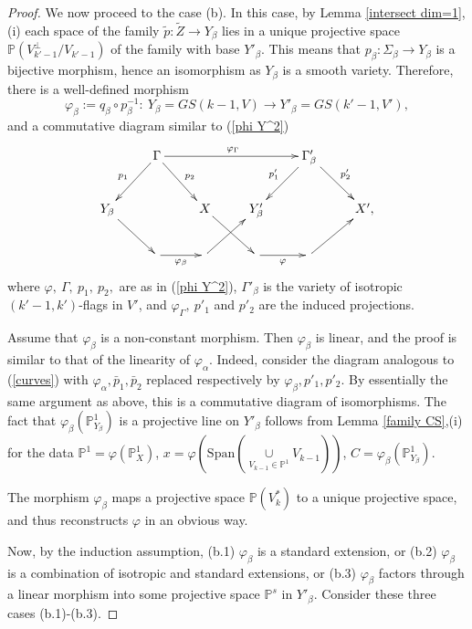 \documentclass[12pt]{amsart}
\newcommand\Span{\text{Span}}
\renewcommand{\phi}{\varphi}
\theoremstyle{definition}
\begin{document}
\begin{proof}
We now proceed to the case (b). In this case,
by Lemma \ref{intersect dim=1},(i) each space of the family $\tilde{p}:\tilde{Z}\to Y_{\beta}$ lies in a unique
projective space $\mathbb{P}(V_{k'-1}^\bot/V_{k'-1})$ of the family with base $Y'_{\beta}$. This
means that $p_{\beta}:\Sigma_{\beta}\to Y_{\beta}$ is a bijective morphism, hence an isomorphism as $Y_{\beta}$ is
a smooth variety. Therefore, there is a well-defined morphism
\begin{equation}\label{1mor i}
\phi_{\beta}:=q_{\beta}\circ p_{\beta}^{-1}:\ Y_{\beta}=GS(k-1,V)\to Y'_{\beta}=GS(k'-1,V'),
\end{equation}
and a commutative diagram similar to (\ref{phi Y^2})
\begin{equation}\label{phi Y^1}
\xymatrix{
& \Gamma\ar[rrr]^{\phi_{\Gamma}}\ar[dl]_{p_1}\ar[dr]^{p_2}&&& \Gamma'_{\beta}\ar[dl]_{p'_1}\ar[dr]^{p'_2}&
\\
Y_{\beta}\ar[dr]&& X\ar[dr]& Y'_{\beta} && X',\\
&\ar[r]_{\phi_{\beta}}&\ar[ur]&\ar[r]_{\phi}&\ar[ur]& }
\end{equation}
where $\phi,\ \Gamma,\ p_1,\ p_2,$ are as in (\ref{phi Y^2}),
$\Gamma'_{\beta}$ is the variety of isotropic $(k'-1,k')$-flags in $V'$,
and $\phi_\Gamma,\ p'_1$ and $p'_2$ are the induced projections.


Assume that $\phi_{\beta}$ is a non-constant morphism.
Then $\phi_{\beta}$ is linear, and the proof is similar to that of the linearity of $\phi_{\alpha}$.
Indeed, consider the diagram analogous to (\ref{curves}) with $\phi_{\alpha},\bar{p}_1,\bar{p}_2$ replaced respectively
by $\phi_{\beta},p'_1,p'_2$. By essentially the same argument as above, this is a commutative diagram of isomorphisms.
The fact that $\phi_{\beta}(\mathbb{P}^1_{Y_{\beta}})$ is a projective line on $Y'_{\beta}$ follows from Lemma
\ref{family CS},(i) for the data $\mathbb{P}^1=\phi(\mathbb{P}^1_X)$,
$x=\phi(\Span(\underset{V_{k-1}\in\mathbb{P}^1}\cup V_{k-1}))$, $C=\phi_{\beta}(\mathbb{P}^1_{Y_{\beta}})$.

The morphism $\phi_{\beta}$ maps a projective space $\mathbb{P}(V_k^*)$ to a unique projective space,
and thus reconstructs $\phi$ in an obvious way.


Now, by the induction assumption, (b.1) $\phi_{\beta}$ is a standard extension, or (b.2) $\phi_{\beta}$ is a
combination of isotropic and standard extensions, or (b.3) $\phi_{\beta}$ factors through a linear morphism into some
projective space $\mathbb{P}^s$ in $Y'_{\beta}$. Consider these three cases (b.1)-(b.3).


\end{proof}
\end{document}
